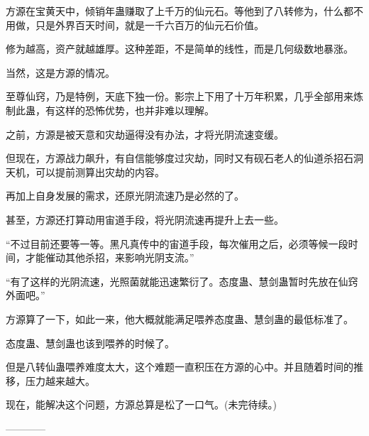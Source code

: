 \begin{this_body}
方源在宝黄天中，倾销年蛊赚取了上千万的仙元石。等他到了八转修为，什么都不用做，只是外界百天时间，就是一千六百万的仙元石价值。

修为越高，资产就越雄厚。这种差距，不是简单的线性，而是几何级数地暴涨。

当然，这是方源的情况。

至尊仙窍，乃是特例，天底下独一份。影宗上下用了十万年积累，几乎全部用来炼制此蛊，有这样的恐怖优势，也并非难以理解。

之前，方源是被天意和灾劫逼得没有办法，才将光阴流速变缓。

但现在，方源战力飙升，有自信能够度过灾劫，同时又有砚石老人的仙道杀招石洞天机，可以提前测算出灾劫的内容。

再加上自身发展的需求，还原光阴流速乃是必然的了。

甚至，方源还打算动用宙道手段，将光阴流速再提升上去一些。

“不过目前还要等一等。黑凡真传中的宙道手段，每次催用之后，必须等候一段时间，才能催动其他杀招，来影响光阴支流。”

“有了这样的光阴流速，光照菌就能迅速繁衍了。态度蛊、慧剑蛊暂时先放在仙窍外面吧。”

方源算了一下，如此一来，他大概就能满足喂养态度蛊、慧剑蛊的最低标准了。

态度蛊、慧剑蛊也该到喂养的时候了。

但是八转仙蛊喂养难度太大，这个难题一直积压在方源的心中。并且随着时间的推移，压力越来越大。

现在，能解决这个问题，方源总算是松了一口气。(未完待续。)

------------

\end{this_body}

